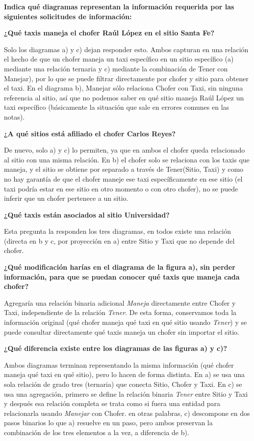\item \textbf{Indica qué diagramas representan la información requerida por las siguientes solicitudes de información:}

\textbf{¿Qué taxis maneja el chofer Raúl López en el sitio Santa Fe?}

Solo los diagramas a) y c) dejan responder esto. Ambos capturan en una relación el hecho de que un chofer maneja un taxi específico en un sitio específico (a) mediante una relación ternaria y c) mediante la combinación de Tener con Manejar), por lo que se puede filtrar directamente por chofer y sitio para obtener el taxi. En el diagrama b), Manejar sólo relaciona Chofer con Taxi, sin ninguna referencia al sitio, así que no podemos saber en qué sitio maneja Raúl López un taxi específico (básicamente la situación que sale en errores comunes en las notas).

\textbf{¿A qué sitios está afiliado el chofer Carlos Reyes?}

De nuevo, solo a) y c) lo permiten, ya que en ambos el chofer queda relacionado al sitio con una misma relación. En b) el chofer solo se relaciona con los taxis que maneja, y el sitio se obtiene por separado a través de Tener(Sitio, Taxi) y como no hay garantía de que el chofer maneje ese taxi específicamente en ese sitio (el taxi podría estar en ese sitio en otro momento o con otro chofer), no se puede inferir que un chofer pertenece a un sitio.

\textbf{¿Qué taxis están asociados al sitio Universidad?}

Esta pregunta la responden los tres diagramas, en todos existe una relación (directa en b y c, por proyección en a) entre Sitio y Taxi que no depende del chofer.

\item \textbf{¿Qué modificación harías en el diagrama de la figura a), sin perder información, para que se puedan conocer qué taxis que maneja cada chofer?}

Agregaría una relación binaria adicional \textit{Maneja} directamente entre Chofer y Taxi, independiente de la relación \textit{Tener}. De esta forma, conservamos toda la información original (qué chofer maneja qué taxi en qué sitio usando \textit{Tener}) y se puede consultar directamente qué taxis maneja un chofer sin importar el sitio.

\item \textbf{¿Qué diferencia existe entre los diagramas de las figuras a) y c)?}

Ambos diagramas terminan representando la misma información (qué chofer maneja qué taxi en qué sitio), pero lo hacen de forma distinta. En a) se usa una sola relación de grado tres (ternaria) que conecta Sitio, Chofer y Taxi. En c) se usa una agregación, primero se define la relación binaria \textit{Tener} entre Sitio y Taxi y después esa relación completa se trata como si fuera una entidad para relacionarla usando \textit{Manejar} con Chofer. en otras palabras, c) descompone en dos pasos binarios lo que a) resuelve en un paso, pero ambos preservan la combinación de los tres elementos a la vez, a diferencia de b).

